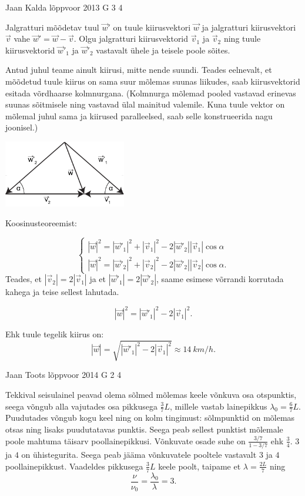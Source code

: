 \documentclass[11pt, twoside]{article}
\begin{document}
{%
{Jaan Kalda} %
{lõppvoor} %
{2013} %
{G 3} %
{4} %
{

\ifSolution
Jalgratturi mõõdetav tuul $\vec w'$ on tuule kiirusvektori $\vec w$ ja jalgratturi kiirusvektori $\vec v$ vahe $\vec w'=\vec w - \vec v$. Olgu jalgratturi kiirusvektorid $\vec v_1$ ja $\vec v_2$ ning tuule kiirusvektorid $\vec w'_1$ ja $\vec w'_2$ vastavalt ühele ja teisele poole sõites.

Antud juhul teame ainult kiirusi, mitte nende suundi. Teades eelnevalt, et mõõdetud tuule kiirus on sama suur mõlemas suunas liikudes, saab kiirusvektorid esitada võrdhaarse kolmnurgana. (Kolmnurga mõlemad pooled vastavad erinevas suunas sõitmisele ning vastavad ülal mainitud valemile. Kuna tuule vektor on mõlemal juhul sama ja kiirused paralleelsed, saab selle konstrueerida nagu joonisel.)

\begin{center}
\includegraphics[width=0.4\textwidth]{2013-v3g-03-jalgrattur}\\
\end{center}

Koosinusteoreemist: 

$$
\begin{cases}
|\vec w|^2 = |\vec w'_1|^2 + |\vec v_1|^2 - 2 |\vec w'_2| |\vec v_1|\cos \alpha \\
|\vec w|^2 = |\vec w'_2|^2 + |\vec v_2|^2 - 2 |\vec w'_2| |\vec v_2|\cos \alpha.
\end{cases}
$$
Teades, et $ |\vec v_2|=2 |\vec v_1|$ ja et $ |\vec w'_1|=2 |\vec w'_2|$, saame esimese võrrandi korrutada kahega ja teise sellest lahutada.

$$|\vec w|^2 = |\vec w'_1|^2 - 2|\vec v_1|^2. $$

Ehk tuule tegelik kiirus on:
$$|\vec w|=\sqrt{|\vec w'_1|^2-2|\vec v_1|^2} \approx \SI{14}{km \per h}.$$
\fi
}

{Jaan Toots} %
{lõppvoor} %
{2014} %
{G 2} %
{4} %
{

\ifSolution
Tekkival seisulainel peavad olema sõlmed mõlemas keele võnkuva osa otspunktis, seega võngub alla vajutades osa pikkusega $\frac{3}{7}L$, millele vastab lainepikkus $\lambda_0=\frac{6}{7}L$. Puudutades võngub kogu keel ning on kolm tingimust: sõlmpunktid on mõlemas otsas ning lisaks puudutatavas punktis. Seega peab sellest punktist mõlemale poole mahtuma täisarv poollainepikkusi. Võnkuvate osade suhe on $\frac{3/7}{1-3/7}$ ehk $\frac{3}{4}$. $3$ ja $4$ on ühistegurita. Seega peab jääma võnkuvatele pooltele vastavalt $3$ ja $4$ poollainepikkust. Vaadeldes pikkusega $\frac{3}{7}L$ keele poolt, taipame et $\lambda=\frac{2L}{7}$ ning
\[
\frac{\nu}{\nu_0}=\frac{\lambda_0}{\lambda}=3.
\]
\fi
}

}
\end{document}
